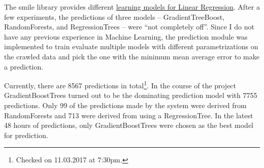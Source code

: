 The smile library provides different \href{http://haifengl.github.io/smile/index.html}{learning models for Linear Regression}. After a few experiments, the predictions of three models -- GradientTreeBoost, RandomForests, and RegressionTrees -- were ``not completely off''. Since I do not have 
any previous experience in Machine Learning, the prediction module was implemented to train evaluate multiple models 
with different parametrizations on the crawled data and pick the one with the minimum mean average error to make a 
prediction.  

Currently, there are 8567 predictions in total\footnote{Checked on 11.03.2017 at 7:30pm.}. In the course of the 
project GradientBoostTrees turned out to be the dominating prediction model with 7755 predictions. Only 99 of the 
predictions made by the system were derived from RandomForests and 713 were derived from using a RegressionTree. In the latest 48 hours of predictions, only GradientBoostTrees were chosen as the best model for prediction. 
